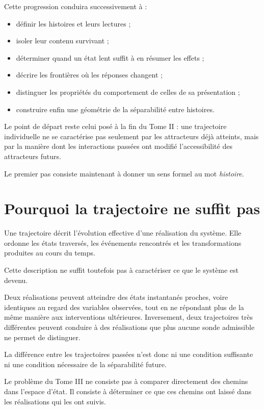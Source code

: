 Cette progression conduira successivement à :

\begin{itemize}
\tightlist
\item
  définir les histoires et leurs lectures ;
\item
  isoler leur contenu survivant ;
\item
  déterminer quand un état lent suffit à en résumer les effets ;
\item
  décrire les frontières où les réponses changent ;
\item
  distinguer les propriétés du comportement de celles de sa présentation ;
\item
  construire enfin une géométrie de la séparabilité entre histoires.
\end{itemize}

Le point de départ reste celui posé à la fin du Tome II : une trajectoire individuelle ne se caractérise pas seulement par les attracteurs déjà atteints, mais par la manière dont les interactions passées ont modifié l'accessibilité des attracteurs futurs.

Le premier pas consiste maintenant à donner un sens formel au mot
\emph{histoire}.

\section{Pourquoi la trajectoire ne suffit pas}
\label{t3-pourquoi-la-trajectoire-ne-suffit-pas}

Une trajectoire décrit l'évolution effective d'une réalisation du système. Elle ordonne les états traversés, les événements rencontrés et les transformations produites au cours du temps.

Cette description ne suffit toutefois pas à caractériser ce que le système est devenu.

Deux réalisations peuvent atteindre des états instantanés proches, voire identiques au regard des variables observées, tout en ne répondant plus de la même manière aux interventions ultérieures. Inversement, deux trajectoires très différentes peuvent conduire à des réalisations que plus aucune sonde admissible ne permet de distinguer.

La différence entre les trajectoires passées n'est donc ni une condition suffisante ni une condition nécessaire de la séparabilité future.

Le problème du Tome III ne consiste pas à comparer directement des chemins dans l'espace d'état. Il consiste à déterminer ce que ces chemins ont laissé dans les réalisations qui les ont suivis.

